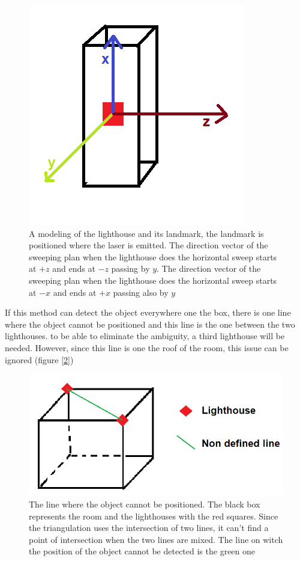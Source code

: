 \documentclass{vldb}
\begin{document}
\begin{figure}
\centering
\includegraphics[width=0.6\columnwidth]{Image/lighthouse.png}
\caption{A modeling of the lighthouse and its landmark, the landmark is positioned where the laser is emitted. The direction vector of the sweeping plan when the lighthouse does the horizontal sweep starts at $+z$ and ends at $-z$ passing by $y$. The direction vector of the sweeping plan when the lighthouse does the horizontal sweep starts at $-x$ and ends at $+x$ passing also by $y$ }
\label{lighthouse}
\end{figure}
If this method can detect the object everywhere one the box, there is one line where the object cannot be positioned and this line is the one between the two lighthouses. to be able to eliminate the ambiguity, a third lighthouse will be needed. However, since this line is one the roof of the room, this issue can be ignored (figure [\ref{bad}])
\begin{figure}
\centering
\includegraphics[width=1.0\columnwidth]{Image/boxundefined.png}
\caption{The line where the object cannot be positioned. The black box represents the room and the lighthouses with the red squares. Since the triangulation uses the intersection of two lines, it can't find a point of intersection when the two lines are mixed. The line on witch the position of the object cannot be detected is the green one}
\label{bad}
\end{figure}
\end{document}
